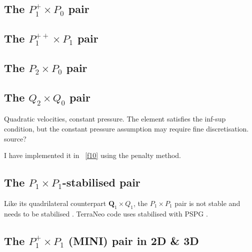 \subsection{The ${ P}_1^+\times P_0$ pair} \label{ss:p1pp0}


\subsection{The ${ P}_1^{++}\times P_1$ pair} \label{ss:p1ppp1}


\subsection{The ${ P}_2\times P_0$ pair} \label{ss:p2p0}


\subsection{The $Q_2\times Q_0$ pair} \label{ss:pairq2q0}

Quadratic velocities, constant pressure. The element satisfies the inf-sup condition, 
but the constant pressure assumption may require fine discretisation.
source?

I have implemented it in \stone~\ref{f10} using the penalty method.

\subsection{The ${ P}_1\times P_1$-stabilised pair} \label{ss:P1P1stab}

Like its quadrilateral counterpart ${\bm Q}_1\times Q_1$, the 
$P_1\times P_1$ pair is not stable and needs to be stabilised \cite{nosi98,tasu00}.
TerraNeo code uses stabilised with PSPG \cite{babd20}.

\textcite{nosi98}

\subsection{The ${ P}_1^+\times P_1$ (MINI) pair in 2D \& 3D \label{pair:mini}}


